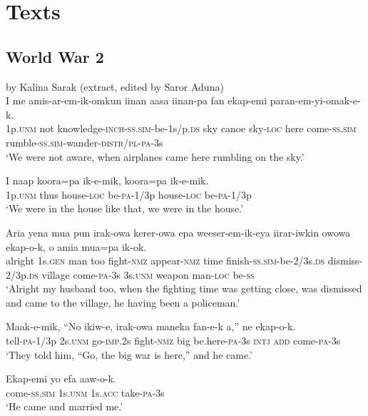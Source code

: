 \chapter{Texts}\label{app:2}
\section{World War 2}\label{app:2:worldwar}
by Kalina Sarak  (extract, edited by Saror Aduna) \\
\ea
\gll  I  me  amis-ar-em-ik-omkun  iinan  aasa  iinan-pa  fan  ekap-emi  paran-em-yi-omak-e-k. \\
1p.\textsc{unm}  not  knowledge-\textsc{inch}-\textsc{ss}.\textsc{sim}-be-1s/p.\textsc{ds}  sky  canoe sky-\textsc{loc}  here  come-\textsc{ss}.\textsc{sim}  rumble-\textsc{ss}.\textsc{sim}-wander-\textsc{distr}/\textsc{pl}-\textsc{pa}-3s \\
\glt ‘We were not aware, when airplanes came here rumbling on the sky.’
\z


\ea
\gll  I  naap  koora=pa  ik-e-mik,  koora=pa  ik-e-mik. \\
1p.\textsc{unm}  thus  house-\textsc{loc}  be-\textsc{pa}-1/3p  house-\textsc{loc}  be-\textsc{pa}-1/3p \\
\glt ‘We were in the house like that, we were in the house.’
\z


\ea
\gll  Aria  yena  mua  pun  irak-owa  kerer-owa  epa weeser-em-ik-eya  iirar-iwkin  owowa  ekap-o-k, o  amia  mua=pa  ik-ok. \\
alright  1s.\textsc{gen}  man  too  fight-\textsc{nmz}  appear-\textsc{nmz}  time finish-\textsc{ss}.\textsc{sim}-be-2/3s.\textsc{ds}  dismiss-2/3p.\textsc{ds}  village  come-\textsc{pa}-3s 3s.\textsc{unm}  weapon  man-\textsc{loc}  be-\textsc{ss} \\
\glt ‘Alright my husband too, when the fighting time was getting close, was dismissed and came to the village, he having been a policeman.’ \\
\z


\ea
\gll  Maak-e-mik,  “No  ikiw-e,  irak-owa  maneka  fan-e-k a,”  ne  ekap-o-k. \\
tell-\textsc{pa}-1/3p  2s.\textsc{unm}  go-\textsc{imp}.2s  fight-\textsc{nmz}  big  be.here-\textsc{pa}-3s \textsc{intj}  \textsc{add}  come-\textsc{pa}-3s \\
\glt ‘They told him, “Go, the big war is here,” and he came.’ \\
\z


\ea
\gll  Ekap-emi  yo  efa  aaw-o-k. \\
come-\textsc{ss}.\textsc{sim}  1s.\textsc{unm}  1s.\textsc{acc}  take-\textsc{pa}-3s \\
\glt ‘He came and married me.’ \\
\z


